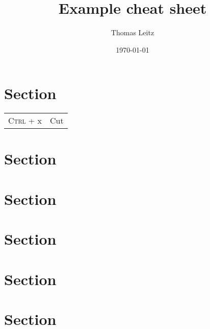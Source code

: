 

\title{Example cheat sheet}
\author{Thomas Leitz}
\date{\today}



\raggedcolumns

\begin{multicols*}{4}
  
\maketitle
\section*{Section}
\begin{tabularx}{\linewidth}{@{}lr@{}}
\textsc{Ctrl} + x & Cut
\end{tabularx}
\section*{Section}
\blindtext[2]
\section*{Section}
\blindtext[2]
\section*{Section}
\blindtext[2]
\section*{Section}
\blindtext[2]
\section*{Section}
\blindtext[1]

\end{multicols*}


